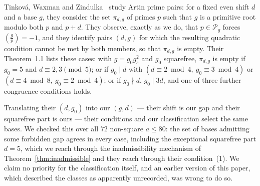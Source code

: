 \documentclass[11pt,reqno]{amsart}
\theoremstyle{plain}
\theoremstyle{definition}
\newcommand{\Leg}[2]{\left(\frac{#1}{#2}\right)}
\begin{document}
Tinkov\'a, Waxman and Zindulka~\cite{TinkovaWaxmanZindulka2023} study Artin
prime pairs: for a fixed even shift $d$ and a base $g$, they consider the set
$\pi_{d,g}$ of primes $p$ such that $g$ is a primitive root modulo both $p$
and $p + d$. They observe, exactly as we do, that $p \in \mathcal{P}_g$ forces
$\Leg{g}{p} = -1$, and they identify pairs $(d,g)$ for which the resulting
quadratic condition cannot be met by both members, so that $\pi_{d,g}$ is
empty. Their Theorem~1.1 lists these cases: with $g = g_0 g_s^2$ and $g_0$
squarefree, $\pi_{d,g}$ is empty if $g_0 = 5$ and $d \equiv 2, 3 \pmod 5$; or
if $g_0 \mid d$ with $(d \equiv 2 \bmod 4,\ g_0 \equiv 3 \bmod 4)$ or
$(d \equiv 4 \bmod 8,\ g_0 \equiv 2 \bmod 4)$; or if $g_0 \nmid d$,
$g_0 \mid 3d$, and one of three further congruence conditions holds.

Translating their $(d, g_0)$ into our $(g, d)$ --- their shift is our gap and
their squarefree part is ours --- their conditions and our classification
select the same bases. We checked this over all $72$ non-square
$a \le 80$: the set of bases admitting some forbidden gap agrees in every
case, including the exceptional squarefree part $d = 5$, which we reach
through the inadmissibility mechanism of Theorem~\ref{thm:inadmissible} and
they reach through their condition~(1). We claim no priority for the
classification itself, and an earlier version of this paper, which described
the classes as apparently unrecorded, was wrong to do so.
\end{document}
